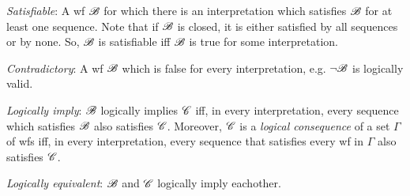 \textit{Satisfiable}: A wf $\mathscr{B}$ for which there is an interpretation which satisfies $\mathscr{B}$ for at least one sequence. Note that if $\mathscr{B}$ is closed, it is either satisfied by all sequences or by none. So, $\mathscr{B}$ is satisfiable iff $\mathscr{B}$ is true for some interpretation.

\textit{Contradictory}: A wf $\mathscr{B}$ which is false for every interpretation, e.g. $\lnot \mathscr{B}$ is logically valid.

\textit{Logically imply}: $\mathscr{B}$ logically implies $\mathscr{C}$ iff, in every interpretation, every sequence which satisfies $\mathscr{B}$ also satisfies $\mathscr{C}$. Moreover, $\mathscr{C}$ is a \textit{logical consequence} of a set $\Gamma$ of wfs iff, in every interpretation, every sequence that satisfies every wf in $\Gamma$ also satisfies $\mathscr{C}$. 

\textit{Logically equivalent}: $\mathscr{B}$ and $\mathscr{C}$ logically imply eachother.
